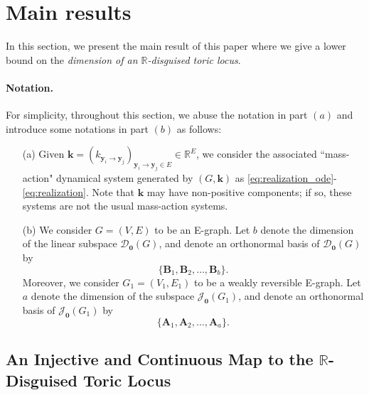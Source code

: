 \documentclass[11pt]{article}
\theoremstyle{plain}
\theoremstyle{definition}
\theoremstyle{remark}
\newcommand\RR{\mathbb{R}}
\newcommand\by{\boldsymbol{y}}
\newcommand\bk{\boldsymbol{k}}
\newcommand\bA{\boldsymbol{A}}
\newcommand\bB{\boldsymbol{B}}
\newcommand{\eJ}{\mathcal{J}_{\textbf{0}}}
\newcommand{\mD}{\mathcal{D}_{\textbf{0}}}
\begin{document}
\section{Main results}
\label{sec:main_result}


In this section, we present the main result of this paper where we give a lower bound on the \emph{dimension of an $\RR$-disguised toric locus}.

\paragraph{Notation.}
For simplicity, throughout this section, we abuse the notation in part $(a)$ and introduce some notations in part $(b)$ as follows:
\begin{enumerate}
\item[(a)] Given $\bk = (k_{\by_i \rightarrow \by_j})_{\by_i \rightarrow \by_j \in E} \in \mathbb{R}^{E}$, we consider the associated ``mass-action" dynamical system generated by $(G, \bk)$ as \eqref{eq:realization_ode}-\eqref{eq:realization}. Note that $\bk$ may have non-positive components; if so, these systems are not the usual mass-action systems.

\item[(b)] We consider $G = (V, E)$ to be an E-graph.
Let $b$ denote the dimension of the linear subspace $\mD(G)$, and denote an orthonormal basis of $\mD(G)$ by
\[
\{\bB_1, \bB_2, \ldots, \bB_b\}.
\]
Moreover, we consider $G_1 = (V_1, E_1)$ to be a weakly reversible E-graph.
Let $a$ denote the dimension of the subspace $\eJ(G_1)$, and denote an orthonormal basis of $\eJ(G_1)$ by 
\[
\{\bA_1, \bA_2, \ldots, \bA_a \}.
\]
\end{enumerate}



\subsection{An Injective and Continuous Map to the \texorpdfstring{$\RR$}{R}-Disguised Toric Locus}
\label{sec:psi_function}
\end{document}

